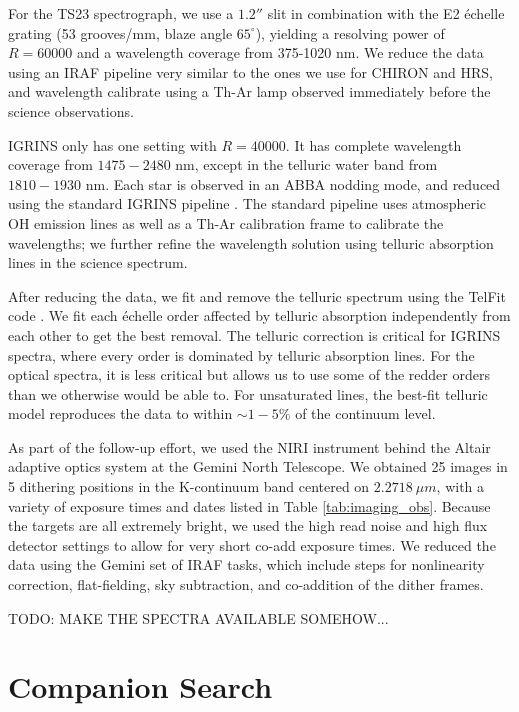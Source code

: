 \documentclass{emulateapj}
\begin{document}
For the TS23 spectrograph, we use a $1.2''$ slit in combination with the E2 \'echelle grating (53 grooves/mm, blaze angle $65^{\circ}$), yielding a resolving power of $R=60000$ and a wavelength coverage from 375-1020 nm. We reduce the data using an IRAF pipeline very similar to the ones we use for CHIRON and HRS, and wavelength calibrate using a Th-Ar lamp observed immediately before the science observations.

IGRINS only has one setting with $R = 40000$. It has complete wavelength coverage from $1475-2480$ nm, except in the telluric water band from $1810 - 1930$ nm. Each star is observed in an ABBA nodding mode, and reduced using the standard IGRINS pipeline \citep{IGRINS_plp_v2}. The standard pipeline uses atmospheric OH emission lines as well as a Th-Ar calibration frame to calibrate the wavelengths; we further refine the wavelength solution using telluric absorption lines in the science spectrum.

After reducing the data, we fit and remove the telluric spectrum using the TelFit code \citep{Gullikson2014}. We fit each \'echelle order affected by telluric absorption independently from each other to get the best removal. The telluric correction is critical for IGRINS spectra, where every order is dominated by telluric absorption lines. For the optical spectra, it is less critical but allows us to use some of the redder orders than we otherwise would be able to. For unsaturated lines, the best-fit telluric model reproduces the data to within $\sim 1-5\%$ of the continuum level.

As part of the follow-up effort, we used the NIRI instrument behind the Altair adaptive optics system at the Gemini North Telescope. We obtained 25 images in 5 dithering positions in the K-continuum band centered on $2.2718\ \mu m$, with a variety of exposure times and dates listed in Table \ref{tab:imaging_obs}. Because the targets are all extremely bright, we used the high read noise and high flux detector settings to allow for very short co-add exposure times. We reduced the data using the Gemini set of IRAF tasks, which include steps for nonlinearity correction, flat-fielding, sky subtraction, and co-addition of the dither frames.


TODO: MAKE THE SPECTRA AVAILABLE SOMEHOW...



\section{Companion Search}
\label{sec:companions}
\end{document}
